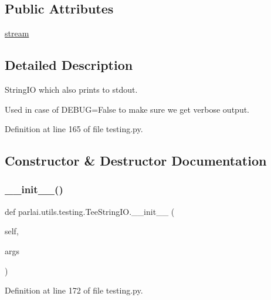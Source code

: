 \subsection*{Public Attributes}
\begin{DoxyCompactItemize}
\item 
\hyperlink{classparlai_1_1utils_1_1testing_1_1TeeStringIO_a4dc6e50f503b4679fe3b3fa0ebd729f1}{stream}
\end{DoxyCompactItemize}


\subsection{Detailed Description}
\begin{DoxyVerb}StringIO which also prints to stdout.

Used in case of DEBUG=False to make sure we get verbose output.
\end{DoxyVerb}
 

Definition at line 165 of file testing.\+py.



\subsection{Constructor \& Destructor Documentation}
\mbox{\label{classparlai_1_1utils_1_1testing_1_1TeeStringIO_a594bf609cf952ab21c412a4c520235d4}} 
\subsubsection{\texorpdfstring{\+\_\+\+\_\+init\+\_\+\+\_\+()}{\_\_init\_\_()}}
{\footnotesize\ttfamily def parlai.\+utils.\+testing.\+Tee\+String\+I\+O.\+\_\+\+\_\+init\+\_\+\+\_\+ (\begin{DoxyParamCaption}\item[{}]{self,  }\item[{}]{args }\end{DoxyParamCaption})}



Definition at line 172 of file testing.\+py.




